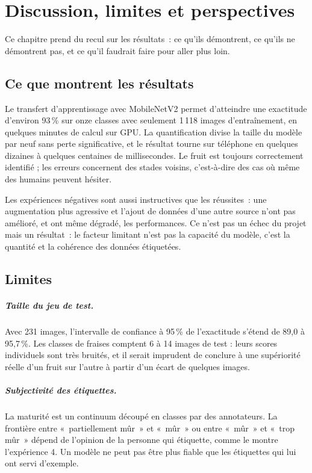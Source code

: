 \chapter{Discussion, limites et perspectives}\label{chap:discussion}

Ce chapitre prend du recul sur les résultats~: ce qu’ils démontrent, ce qu’ils ne démontrent pas, et ce qu’il faudrait faire pour aller plus loin.

\section{Ce que montrent les résultats}

Le transfert d’apprentissage avec MobileNetV2 permet d’atteindre une exactitude d’environ 93\,\% sur onze classes avec seulement 1\,118 images d’entraînement, en quelques minutes de calcul sur GPU. La quantification divise la taille du modèle par neuf sans perte significative, et le résultat tourne sur téléphone en quelques dizaines à quelques centaines de millisecondes. Le fruit est toujours correctement identifié ; les erreurs concernent des stades voisins, c’est-à-dire des cas où même des humains peuvent hésiter.

Les expériences négatives sont aussi instructives que les réussites~: une augmentation plus agressive et l’ajout de données d’une autre source n’ont pas amélioré, et ont même dégradé, les performances. Ce n’est pas un échec du projet mais un résultat~: le facteur limitant n’est pas la capacité du modèle, c’est la quantité et la cohérence des données étiquetées.

\section{Limites}

\paragraph{Taille du jeu de test.} Avec 231 images, l’intervalle de confiance à 95\,\% de l’exactitude s’étend de 89,0 à 95,7\,\%. Les classes de fraises comptent 6 à 14 images de test : leurs scores individuels sont très bruités, et il serait imprudent de conclure à une supériorité réelle d’un fruit sur l’autre à partir d’un écart de quelques images.

\paragraph{Subjectivité des étiquettes.} La maturité est un continuum découpé en classes par des annotateurs. La frontière entre «~partiellement mûr~» et «~mûr~» ou entre «~mûr~» et «~trop mûr~» dépend de l’opinion de la personne qui étiquette, comme le montre l’expérience 4. Un modèle ne peut pas être plus fiable que les étiquettes qui lui ont servi d’exemple.


